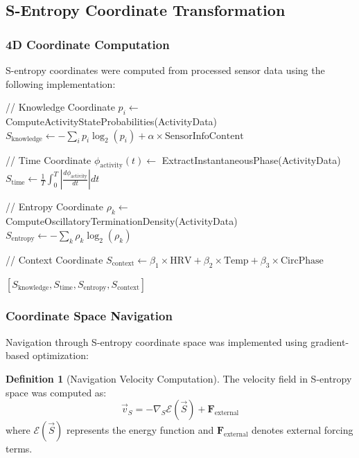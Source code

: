 \documentclass[12pt,a4paper]{article}
\theoremstyle{definition}
\newtheorem{definition}{Definition}[section]
\begin{document}
\subsection{S-Entropy Coordinate Transformation}

\subsubsection{4D Coordinate Computation}

S-entropy coordinates were computed from processed sensor data using the following implementation:

\begin{algorithm}
\caption{S-Entropy Coordinate Transformation}
\begin{algorithmic}
    \State // Knowledge Coordinate
    \State $p_i \leftarrow$ ComputeActivityStateProbabilities(ActivityData)
    \State $S_{\text{knowledge}} \leftarrow -\sum_i p_i \log_2(p_i) + \alpha \times \text{SensorInfoContent}$

    \State // Time Coordinate
    \State $\phi_{\text{activity}}(t) \leftarrow$ ExtractInstantaneousPhase(ActivityData)
    \State $S_{\text{time}} \leftarrow \frac{1}{T} \int_0^T |\frac{d\phi_{\text{activity}}}{dt}| dt$

    \State // Entropy Coordinate
    \State $\rho_k \leftarrow$ ComputeOscillatoryTerminationDensity(ActivityData)
    \State $S_{\text{entropy}} \leftarrow -\sum_k \rho_k \log_2(\rho_k)$

    \State // Context Coordinate
    \State $S_{\text{context}} \leftarrow \beta_1 \times \text{HRV} + \beta_2 \times \text{Temp} + \beta_3 \times \text{CircPhase}$

    \State \Return $[S_{\text{knowledge}}, S_{\text{time}}, S_{\text{entropy}}, S_{\text{context}}]$
\EndProcedure
\end{algorithmic}
\end{algorithm}

\subsubsection{Coordinate Space Navigation}

Navigation through S-entropy coordinate space was implemented using gradient-based optimization:

\begin{definition}[Navigation Velocity Computation]
The velocity field in S-entropy space was computed as:
\begin{equation}
\vec{v}_S = -\nabla_S \mathcal{E}(\vec{S}) + \mathbf{F}_{\text{external}}
\end{equation}
where $\mathcal{E}(\vec{S})$ represents the energy function and $\mathbf{F}_{\text{external}}$ denotes external forcing terms.
\end{definition}
\end{document}
